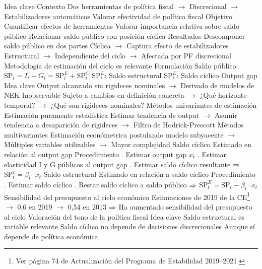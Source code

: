 \documentclass{nuevotema}
\begin{document}
\begin{esquemal}
	\1 
		\2 Idea clave
			\3 Contexto
				\4 Dos herramientas de política fiscal
				\4[] $\to$ Discrecional
				\4[] $\to$ Estabilizadores automáticos
				\4 Valorar efectividad de política fiscal
			\3 Objetivo
				\4 Cuantificar efectos de herramientas
				\4 Valorar importancia relativa sobre saldo público
				\4 Relacionar saldo público con posición cíclica
			\3 Resultados
				\4 Descomponer saldo público en dos partes
				\4[] Cíclica
				\4[] $\to$ Captura efecto de estabilizadores
				\4[] Estructural
				\4[] $\to$ Independiente del ciclo
				\4[] $\to$ Afectada por PF discrecional
				\4 Metodología de estimación del ciclo es relevante
		\2 Formulación
			\3 Saldo público
				\4 $\text{SP}_t = I_t - G_t = \text{SP}_t^E + \text{SP}_t^C$
				\4[] $\text{SP}_t^E$: Saldo estructural
				\4[] $\text{SP}_t^E$: Saldo cíclico
			\3 Output gap
				\4 Idea clave
				\4[] Output alcanzado sin rigideces nominales
				\4[] $\to$ Derivado de modelos de NEK
				\4[] Inobservable
				\4[] Sujeto a cambios en definición concreta
				\4[] $\to$ ¿Qué horizonte temporal?
				\4[] $\to$ ¿Qué son rigideces nominales?
				\4 Métodos univariantes de estimación
				\4[] Estimación puramente estadística
				\4[] Estimar tendencia de output
				\4[] $\to$ Asumir tendencia a desaparición de rigideces
				\4[] $\to$ Filtro de Hodrick-Prescott
				\4 Métodos multivariantes
				\4[] Estimación económetrica postulando modelo subyacente
				\4[] $\to$ Múltiples variables utilizables
				\4[] $\to$ Mayor complejidad
			\3 Saldo cíclico
				\4 Estimado en relación al output gap
				\4 Procedimiento
				. Estimar output gap $x_t$
				. Estimar elasticidad I y G públicos al output gap
				. Estimar saldo cíclico resultante
				\4[] $\Rightarrow$ $\text{SP}^c_t = \beta_t \cdot x_t$
			\3 Saldo estructural
				\4 Estimado en relación a saldo cíclico
				\4 Procedimiento
				. Estimar saldo cíclico
				. Restar saldo cíclico a saldo público
				\4[] $\Rightarrow$ $\text{SP}_t^E = \text{SP}_t - \beta_t \cdot x_t$
				\4 Sensibilidad del presupuesto al ciclo económico
				\4[] Estimaciones de 2019 de la CE\footnote{Ver página 74 de Actualización del Programa de Estabilidad 2019--2021.}
				\4[] $\to$ 0,6 en 2019
				\4[] $\to$ 0,54 en 2013
				\4[] $\Rightarrow$ Ha aumentado sensibilidad del presupuesto al ciclo
		\2 Valoración del tono de la política fiscal
			\3 Idea clave
				\4 Saldo estructural es variable relevante
				\4 Saldo cíclico no depende de decisiones discrecionales
				\4[] Aunque sí depende de política económica

\end{esquemal}
\end{document}
